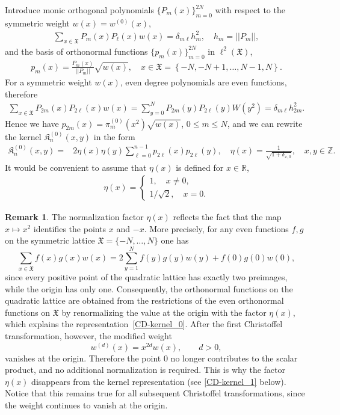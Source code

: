 \documentclass[reqno,11pt]{amsart}
\theoremstyle{plain}
\theoremstyle{definition}
\newtheorem{remark}[thm]{Remark}
\numberwithin{equation}{section}
\begin{document}
Introduce monic orthogonal polynomials $\{P_m(x)\}_{m=0}^{2N}$ with respect to the symmetric weight $w(x)=w^{(0)}(x)$,
\begin{align*}
	\sum\limits_{x\in \mathfrak{X}}P_m(x)P_\ell(x)w(x)=
    \delta_{m\ell}h_m^2,\quad h_m=||P_m||, 
\end{align*}
and the basis of orthonormal functions $\{p_m(x)\}_{m=0}^{2N}$ in $\ell^2(\mathfrak{X})$,
\begin{align}\label{lat_X}
	p_m(x)=\frac{P_m(x)}{||P_m||}\sqrt{w(x)},\quad x\in \mathfrak{X}=\left\{-N, -N+1,\dots,N-1,N\right\}.
\end{align}
For a symmetric weight $w(x)$, even degree polynomials are even functions, therefore
\begin{align*}
	\sum\limits_{x\in \mathfrak{X}}P_{2m}(x)P_{2\ell}(x)w(x)=
    \sum\limits_{y=0}^N P_{2m}(y)P_{2\ell}(y)W(y^2)=
    \delta_{m\ell}h_{2m}^2.
\end{align*}
Hence we have 
$p_{2m}(x) = \pi^{(0)}_m(x^2)\sqrt{w(x)}$, $0\le m\le N$, 
and we can rewrite the kernel $\mathfrak{K}^{(0)}_{n}(x,y)$ in the form
\begin{align}\label{CD-kernel_0}
	\mathfrak{K}^{(0)}_n(x,y) = 
    &2\eta(x)\eta(y)\sum\limits_{\ell=0}^{n-1}p_{2\ell}(x)p_{2\ell}(y), \quad \eta(x)=\frac{1}{\sqrt{1+\delta_{x,0}}}, \quad x,y\in \mathbb{Z}.
\end{align}
It would be convenient to assume that $\eta(x)$ is defined for $x\in \mathbb{R}$,
\begin{align*}
	\eta(x)=\begin{cases}
1,\quad x\neq 0,\\
1/\sqrt{2}, \quad x=0.
\end{cases}
\end{align*} 
\begin{remark}
The normalization factor
$
\eta(x)
$
reflects the fact that the map $x\mapsto x^2$ identifies the points
$x$ and $-x$. More precisely, for any even functions $f,g$ on the
symmetric lattice $\mathfrak X=\{-N,\dots,N\}$ one has
\[
\sum_{x\in\mathfrak X}f(x)g(x)w(x)
=
2\sum_{y=1}^{N}f(y)g(y)w(y)+f(0)g(0)w(0),
\]
since every positive point of the quadratic lattice has exactly two
preimages, while the origin has only one. Consequently, the
orthonormal functions on the quadratic lattice are obtained from the
restrictions of the even orthonormal functions on $\mathfrak X$ by
renormalizing the value at the origin with the factor $\eta(x)$, which
explains the representation~\eqref{CD-kernel_0}. After the first
Christoffel transformation, however, the modified weight
\[
w^{(d)}(x)=x^{2d}w(x), \qquad d>0,
\]
vanishes at the origin. Therefore the point $0$ no longer contributes
to the scalar product, and no additional normalization is required.
This is why the factor $\eta(x)$ disappears from the kernel
representation (see \eqref{CD-kernel_1} below). Notice that this remains true for
all subsequent Christoffel transformations, since the weight continues
to vanish at the origin.
\end{remark}
\end{document}
